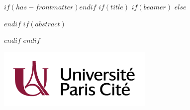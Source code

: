 \begin{center}
  \vspace*{\fill} %
  \begin{minipage}{\textwidth}
    $if(has-frontmatter)$\frontmatter$endif$
    $if(title)$
      $if(beamer)$
        \frame{\titlepage}
      $else$
        \maketitle
      $endif$
      $if(abstract)$
        \begin{abstract}$abstract$\end{abstract}
      $endif$
    $endif$
    \begin{center}
      \includegraphics[width=7.5cm]{logo_ParisCite_couleur.png}
    \end{center}
  \end{minipage}
  \vspace*{\fill} %
\end{center}
\thispagestyle{empty}
\newpage
\setcounter{page}{1}
